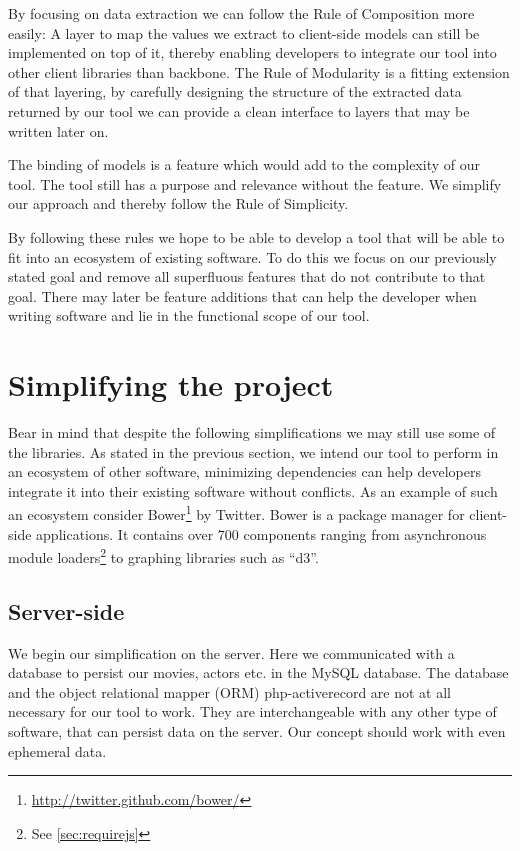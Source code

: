 \documentclass[thesis.tex]{subfiles}
\begin{document}
By focusing on data extraction we can follow the Rule of Composition more
easily: A layer to map the values we extract to client-side models can still be
implemented on top of it, thereby enabling developers to integrate our tool into
other client libraries than backbone.
The Rule of Modularity is a fitting extension of that layering, by carefully
designing the structure of the extracted data returned by our tool we can
provide a clean interface to layers that may be written later on.

The binding of models is a feature which would add to the complexity of our
tool. The tool still has a purpose and relevance without the feature.
We simplify our approach and thereby follow the Rule of Simplicity.

By following these rules we hope to be able to develop a tool that will be able
to fit into an ecosystem of existing software. To do this we focus on our
previously stated goal and remove all superfluous features that do not
contribute to that goal. There may later be feature additions that can help the
developer when writing software and lie in the functional scope of our tool.

\section{Simplifying the project}
\label{sec:simplifying}
Bear in mind that despite the following simplifications we may still use some
of the libraries.
As stated in the previous section, we intend our tool to perform in an ecosystem
of other software, minimizing dependencies can help developers integrate it into
their existing software without conflicts. As an example of such an ecosystem
consider Bower\footnote{\url{http://twitter.github.com/bower/}} by Twitter.
Bower is a package manager for client-side applications. It contains over 700
components ranging from asynchronous module loaders\footnote{
See \ref{sec:requirejs}} to graphing libraries such as ``d3''.

\subsection{Server-side}
We begin our simplification on the server. Here we communicated with a database
to persist our movies, actors etc. in the MySQL database. The database and the
object relational mapper (ORM) php-activerecord are not at all necessary for our
tool to work. They are interchangeable with any other type of software, that can
persist data on the server. Our concept should work with even ephemeral data.
\end{document}
